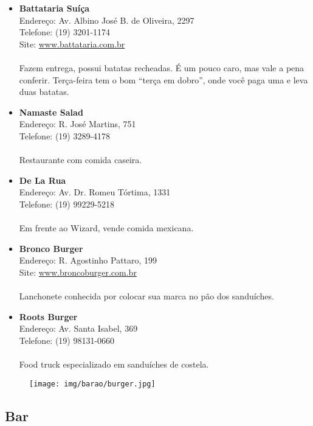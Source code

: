 \begin{itemize}
\item \textbf{Battataria Suíça}
  \\Endereço: Av. Albino José B. de Oliveira, 2297
  \\Telefone: (19) 3201-1174
  \\Site: \url{www.battataria.com.br}
  \\
  \\Fazem entrega, possui batatas recheadas. É um pouco caro, mas vale a pena
  conferir. Terça-feira tem o bom ``terça em dobro'', onde você paga uma e leva
  duas batatas.

\item \textbf{Namaste Salad}
  \\Endereço: R. José Martins, 751
  \\Telefone: (19) 3289-4178
  \\
  \\Restaurante com comida caseira.

\item \textbf{De La Rua}
  \\Endereço: Av. Dr. Romeu Tórtima, 1331
  \\Telefone: (19) 99229-5218
  \\
  \\Em frente ao Wizard, vende comida mexicana.

\item \textbf{Bronco Burger}
  \\Endereço: R. Agostinho Pattaro, 199
  \\Site: \url{www.broncoburger.com.br}
  \\
  \\Lanchonete conhecida por colocar sua marca no pão dos sanduíches.

\item \textbf{Roots Burger}
  \\Endereço: Av. Santa Isabel, 369
  \\Telefone: (19) 98131-0660
  \\
  \\Food truck especializado em sanduíches de costela.
\end{itemize}

\begin{figure}[h!]
  \centering
  \texttt{[image: img/barao/burger.jpg]}
\end{figure}

\subsection{Bar}

